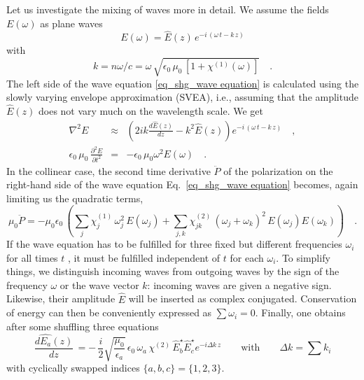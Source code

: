 Let us investigate the mixing of waves more in detail.
We assume the fields $E(\omega)$ as plane waves
\begin{equation}
  E(\omega) = \hat{E}(z) \, e^{-i \, (\omega \,
  t - k \, z)} 
\end{equation}
with
\begin{equation}
 k = n
  \omega / c = \omega \, \sqrt{\epsilon_0 \, \mu_0 \, [1+
  \chi^{(1)}(\omega)]} \quad.
\end{equation}
The left side of the wave equation
\ref{eq_shg_wave equation} is calculated using the slowly varying envelope approximation (SVEA), i.e., assuming that 
 the amplitude $ \hat{E}(z)$ does not vary much on the wavelength scale. We get
\begin{eqnarray}
 \nabla^2 E & \approx &  \left( 2 i k \frac{d
 \hat{E}(z)}{dz} - k^2 \hat{E}(z) \right) e^{-i \, (\omega \,
  t - k \, z)}  \quad ,\label{gl_theo_nlo_nabla2E}\\
%
 \epsilon_0 \, \mu_0 \, \frac{\partial^2 E}{\partial t^2} &=& -   \epsilon_0 \,
 \mu_0 \omega^2 E(\omega)  \quad .\label{gl_theo_nlo_partial2E_t2}
\end{eqnarray}
%
In the collinear case, the second time derivative 
$\ddot{P}$ of the polarization on the right-hand side of the wave equation Eq.~\ref{eq_shg_wave equation} becomes, again limiting us the quadratic terms, 
\begin{equation}
  \mu_0 \ddot{P} = - \mu_0 \epsilon_0 \, \left( \sum_j \chi^{(1)}_{j}\, \omega_j^2 \, E(\omega_j)
     + \sum_{j,k} \chi^{(2)}_{jk} \, (\omega_j + \omega_k)^2 \, E(\omega_j) E(\omega_k) \right) \quad .
     \label{eq:shg_ddot_p}
\end{equation}
If the wave equation  has to be fulfilled for
three fixed but different frequencies $\omega_i$ for all
times $t$ , it must be fulfilled independent of  $t$ for each
$\omega_i$. To simplify things, we distinguish 
incoming waves from outgoing waves by the sign of the
frequency $\omega$ or the wave vector $k$: 
incoming waves are given a negative sign.
Likewise, their amplitude $\hat{E}$ will be inserted as complex conjugated. Conservation of energy can then be conveniently expressed as $\sum
\omega_i = 0$. Finally, one obtains after some shuffling
 three
equations 
\begin{equation}
 \frac{d  \hat{E_a}(z)}{dz} \,
= %
- \, \frac{i}{2}   \sqrt{ \frac{\mu_0} {\epsilon_a}}\,\epsilon_0
  \, \omega_a \, \chi^{(2)} \, \hat{E}_b^{\star} \hat{E}_c^{\star}  e^{-i  \Delta k \, z}
  \qquad \text{with} \qquad \Delta k = \sum k_i
  \label{eq_shg_e_of_z_nl}
\end{equation}
with  cyclically swapped  indices
$\{a,b,c\} = \{1,2,3\} $.

